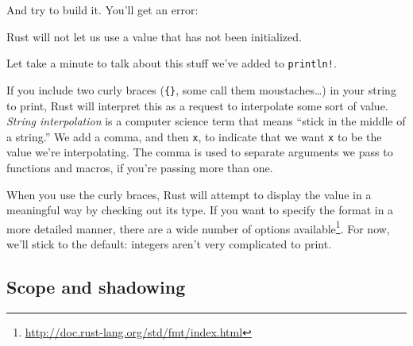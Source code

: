 \documentclass[a4paper,]{book}
\newenvironment{Shaded}{\begin{snugshade}}{\end{snugshade}}
\newcommand{\KeywordTok}[1]{\textcolor[rgb]{0.13,0.29,0.53}{\textbf{{#1}}}}
\newcommand{\StringTok}[1]{\textcolor[rgb]{0.31,0.60,0.02}{{#1}}}
\newcommand{\NormalTok}[1]{{#1}}
\renewcommand{\href}[2]{#2\footnote{\url{#1}}}
\begin{document}
And try to build it. You'll get an error:

\begin{Shaded}
\end{Shaded}

Rust will not let us use a value that has not been initialized.

Let take a minute to talk about this stuff we've added to
\texttt{println!}.

If you include two curly braces (\texttt{\{\}}, some call them
moustaches\ldots{}) in your string to print, Rust will interpret this as
a request to interpolate some sort of value. \emph{String interpolation}
is a computer science term that means ``stick in the middle of a
string.'' We add a comma, and then \texttt{x}, to indicate that we want
\texttt{x} to be the value we're interpolating. The comma is used to
separate arguments we pass to functions and macros, if you're passing
more than one.

When you use the curly braces, Rust will attempt to display the value in
a meaningful way by checking out its type. If you want to specify the
format in a more detailed manner, there are a
\href{http://doc.rust-lang.org/std/fmt/index.html}{wide number of
options available}. For now, we'll stick to the default: integers aren't
very complicated to print.

\subsection{Scope and shadowing}\label{scope-and-shadowing}
\end{document}
